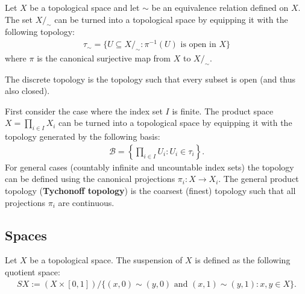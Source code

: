     \begin{example}
        Let $X$ be a topological space and let $\sim$ be an equivalence relation defined on $X$. The set $X/_\sim$ can be turned into a topological space by equipping it with the following topology:
        \begin{gather}
            \label{topology:quotient_space}
            \tau_\sim = \big\{U\subseteq X/_\sim:\pi^{-1}(U)\text{ is open in }X\big\}
        \end{gather}
        where $\pi$ is the canonical surjective map from $X$ to $X/_\sim$.
    \end{example}

    \begin{example}
        The discrete topology is the topology such that every subset is open (and thus also closed).
    \end{example}

    \begin{example}\label{topology:tychonoff_topology}
        First consider the case where the index set $I$ is finite. The product space $X = \prod_{i\in I}X_i$ can be turned into a topological space by equipping it with the topology generated by the following basis:
        \begin{gather}
            \mathcal{B} = \left\{\prod_{i\in I}U_i:U_i\in\tau_i\right\}.
        \end{gather}
        For general cases (countably infinite and uncountable index sets) the topology can be defined using the canonical projections $\pi_i:X\rightarrow X_i$. The general product topology (\textbf{Tychonoff topology}) is the coarsest (finest) topology such that all projections $\pi_i$ are continuous.
    \end{example}


\subsection{Spaces}

    \begin{construct}[Suspension]\label{topology:suspension}
        Let $X$ be a topological space. The suspension of $X$ is defined as the following quotient space:
        \begin{gather}
            SX := (X\times [0, 1])/\big\{(x, 0) \sim (y, 0)\text{ and }(x, 1) \sim (y, 1):x, y\in X\big\}.
        \end{gather}
    \end{construct}


